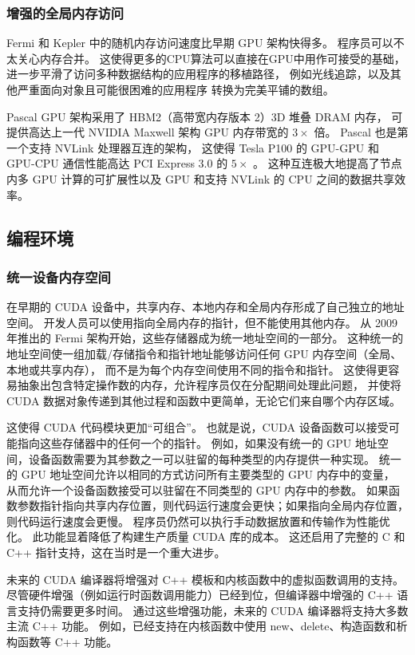 \subsubsection{增强的全局内存访问}
Fermi 和 Kepler 中的随机内存访问速度比早期 GPU 架构快得多。 程序员可以不太关心内存合并。 
这使得更多的CPU算法可以直接在GPU中用作可接受的基础，进一步平滑了访问多种数据结构的应用程序的移植路径，
例如光线追踪，以及其他严重面向对象且可能很困难的应用程序 转换为完美平铺的数组。

Pascal GPU 架构采用了 HBM2（高带宽内存版本 2）3D 堆叠 DRAM 内存，
可提供高达上一代 NVIDIA Maxwell 架构 GPU 内存带宽的 $3 \times$ 倍。 
Pascal 也是第一个支持 NVLink 处理器互连的架构，
这使得 Tesla P100 的 GPU-GPU 和 GPU-CPU 通信性能高达 PCI Express 3.0 的 $5 \times$ 。 
这种互连极大地提高了节点内多 GPU 计算的可扩展性以及 GPU 和支持 NVLink 的 CPU 之间的数据共享效率。

\subsection{编程环境}
\subsubsection{统一设备内存空间}
在早期的 CUDA 设备中，共享内存、本地内存和全局内存形成了自己独立的地址空间。 
开发人员可以使用指向全局内存的指针，但不能使用其他内存。 
从 2009 年推出的 Fermi 架构开始，这些存储器成为统一地址空间的一部分。 
这种统一的地址空间使一组加载/存储指令和指针地址能够访问任何 GPU 内存空间（全局、本地或共享内存），
而不是为每个内存空间使用不同的指令和指针。 
这使得更容易抽象出包含特定操作数的内存，允许程序员仅在分配期间处理此问题，
并使将 CUDA 数据对象传递到其他过程和函数中更简单，无论它们来自哪个内存区域。

这使得 CUDA 代码模块更加“可组合”。 也就是说，CUDA 设备函数可以接受可能指向这些存储器中的任何一个的指针。 
例如，如果没有统一的 GPU 地址空间，设备函数需要为其参数之一可以驻留的每种类型的内存提供一种实现。 
统一的 GPU 地址空间允许以相同的方式访问所有主要类型的 GPU 内存中的变量，
从而允许一个设备函数接受可以驻留在不同类型的 GPU 内存中的参数。 
如果函数参数指针指向共享内存位置，则代码运行速度会更快；如果指向全局内存位置，则代码运行速度会更慢。 
程序员仍然可以执行手动数据放置和传输作为性能优化。 此功能显着降低了构建生产质量 CUDA 库的成本。 
这还启用了完整的 C 和 C++ 指针支持，这在当时是一个重大进步。

未来的 CUDA 编译器将增强对 C++ 模板和内核函数中的虚拟函数调用的支持。 
尽管硬件增强（例如运行时函数调用能力）已经到位，但编译器中增强的 C++ 语言支持仍需要更多时间。 
通过这些增强功能，未来的 CUDA 编译器将支持大多数主流 C++ 功能。 
例如，已经支持在内核函数中使用 new、delete、构造函数和析构函数等 C++ 功能。

